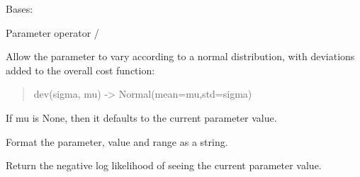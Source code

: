 \documentclass[letterpaper,10pt,english]{sphinxmanual}
\begin{document}
\begin{fulllineitems}
\label{api/mystic.parameter:refl1d.mystic.parameter.OperatorDiv}
Bases: {\hyperref[api/mystic.parameter:refl1d.mystic.parameter.BaseParameter]{}}

Parameter operator /

\begin{fulllineitems}
\label{api/mystic.parameter:refl1d.mystic.parameter.OperatorDiv.dev}
Allow the parameter to vary according to a normal distribution, with
deviations added to the overall cost function:
\begin{quote}

dev(sigma, mu) -\textgreater{} Normal(mean=mu,std=sigma)
\end{quote}

If mu is None, then it defaults to the current parameter value.

\end{fulllineitems}


\begin{fulllineitems}
\label{api/mystic.parameter:refl1d.mystic.parameter.OperatorDiv.dvalue}
\end{fulllineitems}


\begin{fulllineitems}
\label{api/mystic.parameter:refl1d.mystic.parameter.OperatorDiv.format}
Format the parameter, value and range as a string.

\end{fulllineitems}


\begin{fulllineitems}
\label{api/mystic.parameter:refl1d.mystic.parameter.OperatorDiv.nllf}
Return the negative log likelihood of seeing the current parameter value.

\end{fulllineitems}


\end{fulllineitems}
\end{document}
